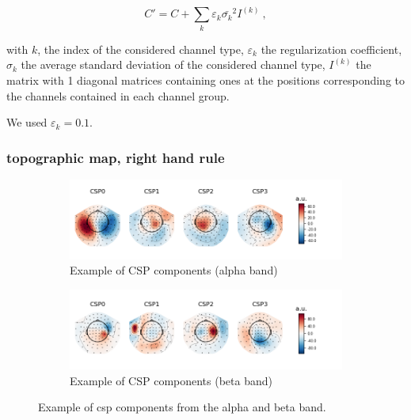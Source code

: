\begin{equation}
    C' = C + \sum_k {\varepsilon_k \bar{\sigma_k}^2 I^{(k)}}\ ,
\end{equation}

with $k$, the index of the considered channel type, $\varepsilon_k$ the regularization coefficient, $\sigma_k$ the average standard deviation of the considered channel type, $I^{(k)}$ the matrix with 1 diagonal matrices containing ones at the positions corresponding to the channels contained in each channel group.

We used $\varepsilon_k = 0.1$.


\subsubsection{topographic map, right hand rule}

\begin{figure}
    \centering
    \begin{subfigure}[b]{0.55\textwidth}
       \includegraphics[width=1\linewidth]{images_report/sensor/csp_individual/sub_155_alpha.png}
       \caption{Example of CSP components (alpha band)}
       \label{fig:csp_component_alpha_band}
    \end{subfigure}
    
    \begin{subfigure}[b]{0.55\textwidth}
       \includegraphics[width=1\linewidth]{images_report/sensor/csp_individual/sub_215_beta.png}
       \caption{Example of CSP components (beta band)}
       \label{fig:csp_component_beta_band}
    \end{subfigure}

    \caption[Example of csp components from the alpha and beta band.]%
    {Example of csp components from the alpha and beta band.}
    \label{example_csp_component}
\end{figure}

